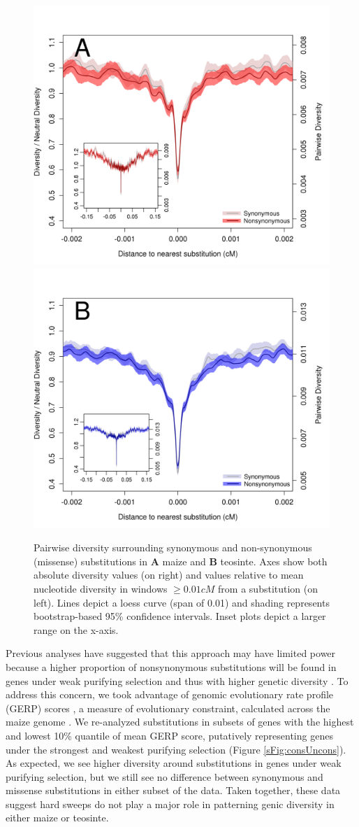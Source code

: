 \documentclass{pnastwo}
\begin{document}
\begin{article}
\begin{figure}
\centering
\includegraphics[width=.45\textwidth]{FigsAndFiles/plotDiversity_TvM_Folded2_Significance_Aug}
\hspace{0.05\textwidth} \includegraphics[width=.45\textwidth]{FigsAndFiles/plotDiversity_TvT_Folded2_Significance_Aug}
\caption{Pairwise diversity surrounding synonymous and non-synonymous (missense)
  substitutions in {\bf A} maize and {\bf B} teosinte. Axes show both absolute diversity values (on right) and values relative to mean nucleotide diversity in windows $\geq 0.01 cM$ from a substitution (on left).  Lines depict a loess curve (span of 0.01) and shading represents bootstrap-based 95\% confidence intervals. Inset plots depict a larger range on the x-axis. \label{fig:hardSweeps}}
\end{figure}

Previous analyses have suggested that this approach may have limited power because a higher proportion of nonsynonymous substitutions will be found in genes under weak purifying selection and thus with higher genetic diversity \cite{enard2014}. 
To address this concern, we took advantage of genomic evolutionary rate profile (GERP) scores \cite{davydov2010}, a measure of evolutionary constraint, calculated across the maize genome \cite{rodgers2015}. 
We re-analyzed substitutions in subsets of genes with the highest and lowest 10\% quantile of mean GERP score, putatively representing genes under the strongest and weakest purifying selection  (Figure \ref{sFig:consUncons}). 
As expected, we see higher diversity around substitutions in genes under weak purifying selection, but we still see no difference between synonymous and missense substitutions in either subset of the data.
Taken together, these data suggest hard sweeps do not play a major role in patterning genic diversity in either maize or teosinte.


\end{article}
\end{document}
